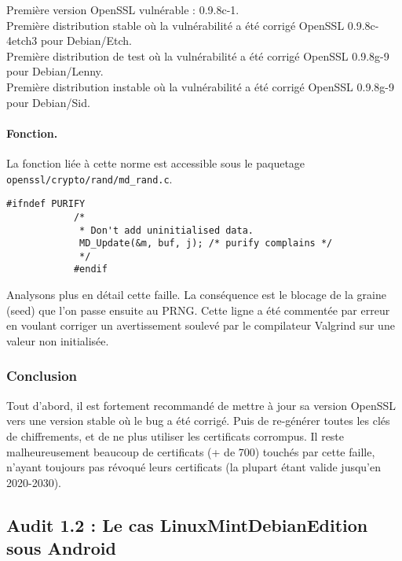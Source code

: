 			Première version OpenSSL vulnérable : 0.9.8c-1.\\
			Première distribution stable où la vulnérabilité a été corrigé
			OpenSSL 0.9.8c-4etch3 pour Debian/Etch.\\	
			Première distribution de test où la vulnérabilité a été corrigé
			OpenSSL 0.9.8g-9 pour Debian/Lenny.\\
			Première distribution instable où la vulnérabilité a été corrigé
			OpenSSL 0.9.8g-9 pour Debian/Sid.\\
			
						
			\paragraph{Fonction.\\} 
			
			La fonction liée à cette norme est accessible sous le paquetage 
			\texttt{openssl/crypto/rand/md\_rand.c}.
			
			
			\begin{lstlisting}[style=customc,caption=md\_rand.c, label=mdrand]
			#ifndef PURIFY
			/*
			 * Don't add uninitialised data.
			 MD_Update(&m, buf, j); /* purify complains */
			 */
			#endif
			\end{lstlisting}
			
			Analysons plus en détail cette faille. 
			La conséquence est le blocage de la graine (seed) que l'on 
			passe ensuite au PRNG.
			Cette ligne a été commentée par erreur en voulant corriger un
			avertissement soulevé par le compilateur Valgrind sur une valeur
			non initialisée.

		\subsubsection{Conclusion}
		
			Tout d'abord, il est fortement recommandé de mettre à jour sa
			version OpenSSL vers une version stable où le bug a été corrigé.
			Puis de re-générer toutes les clés de chiffrements, et de ne plus
			utiliser les certificats corrompus.
			Il reste malheureusement beaucoup de certificats (+ de 700) 
			touchés par cette faille, n'ayant toujours pas révoqué leurs
			certificats (la plupart étant valide jusqu'en 2020-2030).
			
	\subsection{Audit 1.2 : Le cas LinuxMintDebianEdition sous Android}
